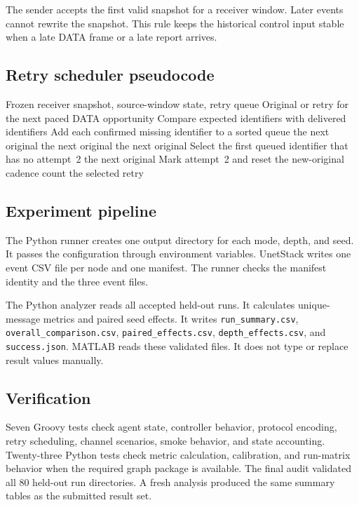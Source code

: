 \documentclass[11pt]{article}
\begin{document}
The sender accepts the first valid snapshot for a receiver window.
Later events cannot rewrite the snapshot.
This rule keeps the historical control input stable when a late DATA frame or a late report arrives.

\subsection{Retry scheduler pseudocode}\label{sec:impl-retry}
\begin{algorithm}[H]
\caption{Bounded selective retry scheduler}\label{alg:retry}
\footnotesize
\begin{algorithmic}[1]
\Require Frozen receiver snapshot, source-window state, retry queue
\Ensure Original or retry for the next paced DATA opportunity
\State Compare expected identifiers with delivered identifiers
\State Add each confirmed missing identifier to a sorted queue
  \State \Return the next original
\EndIf
{}
  \State \Return the next original
\EndIf
{}
  \State \Return the next original
\EndIf
\State Select the first queued identifier that has no attempt~2
  \State \Return the next original
\EndIf
\State Mark attempt~2 and reset the new-original cadence count
\State \Return the selected retry
\end{algorithmic}
\end{algorithm}

\subsection{Experiment pipeline}\label{sec:impl-pipeline}
\noindent
The Python runner creates one output directory for each mode, depth, and seed.
It passes the configuration through environment variables.
UnetStack writes one event CSV file per node and one manifest.
The runner checks the manifest identity and the three event files.

The Python analyzer reads all accepted held-out runs.
It calculates unique-message metrics and paired seed effects.
It writes \texttt{run\_summary.csv}, \texttt{overall\_comparison.csv}, \texttt{paired\_effects.csv}, \texttt{depth\_effects.csv}, and \texttt{success.json}.
MATLAB reads these validated files.
It does not type or replace result values manually.

\subsection{Verification}\label{sec:impl-verification}
\noindent
Seven Groovy tests check agent state, controller behavior, protocol encoding, retry scheduling, channel scenarios, smoke behavior, and state accounting.
Twenty-three Python tests check metric calculation, calibration, and run-matrix behavior when the required graph package is available.
The final audit validated all 80 held-out run directories.
A fresh analysis produced the same summary tables as the submitted result set.
\end{document}
